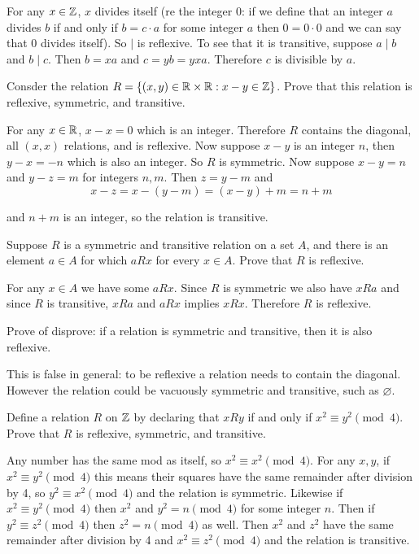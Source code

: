 \documentclass{article}
\begin{document}
For any $x \in \mathbb{Z}$, $x$ divides itself (re the integer 0: if we define that an integer $a$ divides $b$ if and only if $b = c\cdot a$ for some integer $a$ then $0 = 0 \cdot 0$ and we can say that 0 divides itself). So $\mid$ is reflexive. To see that it is transitive, suppose $a \mid b$ and $b \mid c$. Then $b = xa$ and $c = yb = yxa$. Therefore $c$ is divisible by $a$.

\begin{problem}
Consder the relation $R = \{(x, y) \in \mathbb{R} \times \mathbb{R}: x - y \in \mathbb{Z}\}$. Prove that this relation is reflexive, symmetric, and transitive.
\end{problem}

For any $x \in \mathbb{R}$, $x - x = 0$ which is an integer. Therefore $R$ contains the diagonal, all $(x, x)$ relations, and is reflexive. Now suppose $x - y$ is an integer $n$, then $y - x = -n$ which is also an integer. So $R$ is symmetric. Now suppose $x - y = n$ and $y - z = m$ for integers $n, m$. Then $z = y - m$ and
$$x - z = x - (y - m) = (x - y) + m = n + m$$

and $n + m$ is an integer, so the relation is transitive.

\begin{problem}
Suppose $R$ is a symmetric and transitive relation on a set $A$, and there is an element $a \in A$ for which $aRx$ for every $x \in A$. Prove that $R$ is reflexive.
\end{problem}

For any $x \in A$ we have some $aRx$. Since $R$ is symmetric we also have $xRa$ and since $R$ is transitive, $xRa$ and $aRx$ implies $xRx$. Therefore $R$ is reflexive.

\begin{problem}
Prove of disprove: if a relation is symmetric and transitive, then it is also reflexive.
\end{problem}

This is false in general: to be reflexive a relation needs to contain the diagonal. However the relation could be vacuously symmetric and transitive, such as $\varnothing$.

\begin{problem}
Define a relation $R$ on $\mathbb{Z}$ by declaring that $xRy$ if and only if $x^2 \equiv y^2 \pmod{4}$. Prove that $R$ is reflexive, symmetric, and transitive.
\end{problem}

Any number has the same mod as itself, so $x^2 \equiv x^2 \pmod{4}$. For any $x, y$, if $x^2 \equiv y^2 \pmod{4}$ this means their squares have the same remainder after division by 4, so $y^2 \equiv x^2 \pmod{4}$ and the relation is symmetric. Likewise if $x^2 \equiv y^2 \pmod{4}$ then $x^2$ and $y^2 = n \pmod{4}$ for some integer $n$. Then if $y^2 \equiv z^2 \pmod{4}$ then $z^2 = n \pmod{4}$ as well. Then $x^2$ and $z^2$ have the same remainder after division by 4 and $x^2 \equiv z^2 \pmod{4}$ and the relation is transitive.
\end{document}
